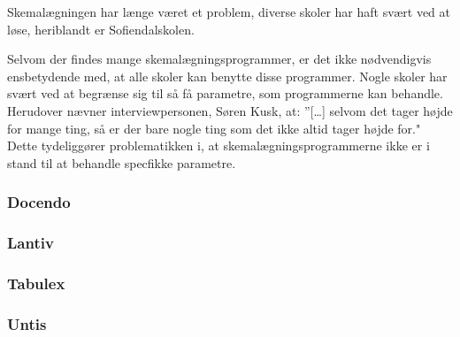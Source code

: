 Skemalægningen har længe været et problem, diverse skoler har haft svært ved at løse, heriblandt er Sofiendalskolen.

Selvom der findes mange skemalægningsprogrammer, er det ikke nødvendigvis ensbetydende med, at alle skoler kan benytte disse programmer. Nogle skoler har svært ved at begrænse sig til så få parametre, som programmerne kan behandle. Herudover nævner interviewpersonen, Søren Kusk, at: ”[…] selvom det tager højde for mange ting, så er der bare nogle ting som det ikke altid tager højde for." Dette tydeliggører problematikken i, at skemalægningsprogrammerne ikke er i stand til at behandle specfikke parametre.

  \subsubsection{Docendo}
    

  \subsubsection{Lantiv}
    

  \subsubsection{Tabulex}
    

  \subsubsection{Untis}
    

